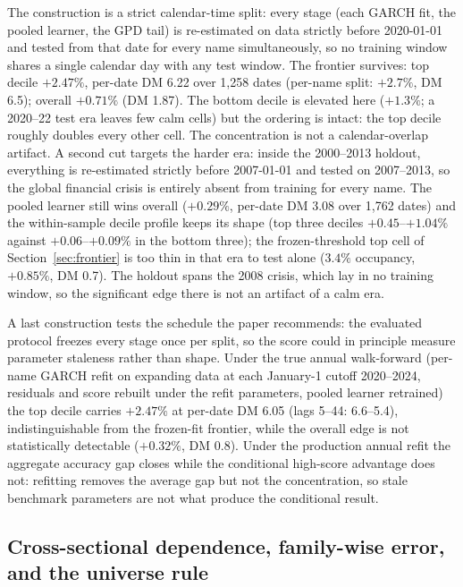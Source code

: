 \documentclass[11pt]{article}
\theoremstyle{remark}
\begin{document}
The construction is a strict calendar-time split: every stage (each GARCH fit, the pooled learner, the GPD tail) is re-estimated on data strictly before 2020-01-01 and tested from that date for
every name simultaneously, so no training window shares a single
calendar day with any test window. The frontier survives: top decile
$+2.47\%$, per-date DM 6.22 over 1{,}258 dates (per-name split:
$+2.7\%$, DM 6.5); overall $+0.71\%$ (DM 1.87). The bottom decile is
elevated here ($+1.3\%$; a 2020--22 test era leaves few calm cells)
but the ordering is intact: the top decile roughly doubles every
other cell. The concentration is not a calendar-overlap artifact.
A second cut targets the harder era: inside the 2000--2013 holdout,
everything is re-estimated strictly before 2007-01-01 and tested on
2007--2013, so the global financial crisis is entirely absent from
training for every name. The pooled learner still wins overall
($+0.29\%$, per-date DM 3.08 over 1{,}762 dates) and the
within-sample decile profile keeps its shape (top three deciles
$+0.45$--$+1.04\%$ against $+0.06$--$+0.09\%$ in the bottom three);
the frozen-threshold top cell of Section~\ref{sec:frontier} is too
thin in that era to test alone ($3.4\%$ occupancy, $+0.85\%$, DM
0.7). The holdout spans the 2008 crisis, which lay in no training window,
so the significant edge there is not an artifact of a calm era.

A last construction tests the schedule the paper recommends: the
evaluated protocol freezes every stage once per split, so the score
could in principle measure parameter staleness rather than shape.
Under the true annual walk-forward (per-name GARCH refit on
expanding data at each January-1 cutoff 2020--2024, residuals and
score rebuilt under the refit parameters, pooled learner retrained) the top decile carries $+2.47\%$ at per-date DM 6.05 (lags 5--44:
6.6--5.4), indistinguishable from the frozen-fit frontier, while the
overall edge is not statistically detectable ($+0.32\%$, DM 0.8).
Under the production annual refit the aggregate accuracy gap closes
while the conditional high-score advantage does not: refitting removes
the average gap but not the concentration, so stale benchmark
parameters are not what produce the conditional result.

\subsection{Cross-sectional dependence, family-wise error, and the
universe rule}
\label{sec:fwer}
\end{document}
